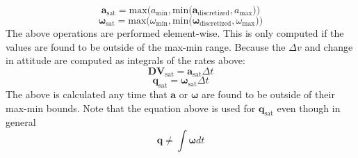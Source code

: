 \begin{equation}
	\bm{a}_{\mathrm{sat}} = \mathrm{max}\big(a_{\mathrm{min}}, \mathrm{min}\big(    \bm{a}_{\mathrm{discretized}}, a_{\mathrm{max}}    \big)   \big)
\end{equation}
\begin{equation}
\bm{\omega}_{\mathrm{sat}} = \mathrm{max}\big(\omega_{\mathrm{min}}, \mathrm{min}\big(    \bm{\omega}_{\mathrm{discretized}}, \omega_{\mathrm{max}}    \big)   \big)
\end{equation}
The above operations are performed element-wise. This is only computed if the values are found to be outside of the max-min range.
Because the $\Delta v$ and change in attitude are computed as integrals of the rates above:
\begin{equation}
\bm{DV}_{\mathrm{sat}} = \bm{a}_{\mathrm{sat}}  \Delta t
\end{equation}
\begin{equation}
\bm{q}_{\mathrm{sat}} = \bm{\omega}_{\mathrm{sat}}  \Delta t
\end{equation}
The above is calculated any time that $\bm{a}$ or $\bm{\omega}$ are found to be outside of their max-min bounds. Note that the equation above is used for $\bm{q}_{\mathrm{sat}}$ even though in general
\begin{equation}
	\bm{q} \neq \int \bm{\omega} dt
\end{equation}
